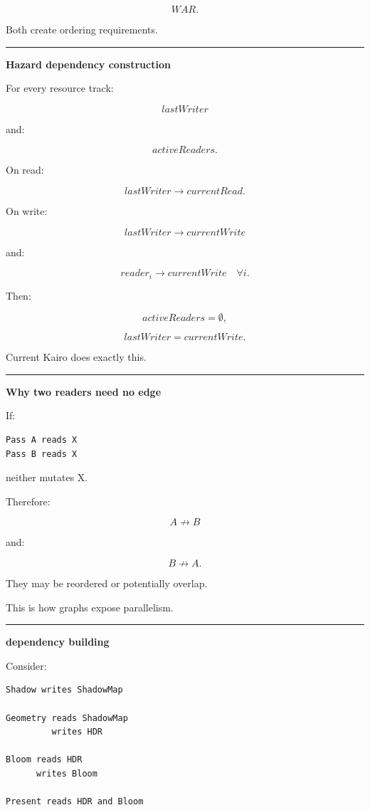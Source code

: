 \[
WAR.
\]

Both create ordering requirements.

\begin{center}\rule{0.5\linewidth}{0.5pt}\end{center}

\textbf{Hazard dependency construction}

For every resource track:

\[
lastWriter
\]

and:

\[
activeReaders.
\]

On read:

\[
lastWriter
\rightarrow
currentRead.
\]

On write:

\[
lastWriter
\rightarrow
currentWrite
\]

and:

\[
reader_i
\rightarrow
currentWrite
\quad\forall i.
\]

Then:

\[
activeReaders=\emptyset,
\]

\[
lastWriter=currentWrite.
\]

Current Kairo does exactly this.

\begin{center}\rule{0.5\linewidth}{0.5pt}\end{center}

\textbf{Why two readers need no edge}

If:

\begin{verbatim}
Pass A reads X
Pass B reads X
\end{verbatim}

neither mutates X.

Therefore:

\[
A
\not\rightarrow
B
\]

and:

\[
B
\not\rightarrow
A.
\]

They may be reordered or potentially overlap.

This is how graphs expose parallelism.

\begin{center}\rule{0.5\linewidth}{0.5pt}\end{center}

\textbf{dependency building}

Consider:

\begin{verbatim}
Shadow writes ShadowMap

Geometry reads ShadowMap
         writes HDR

Bloom reads HDR
      writes Bloom

Present reads HDR and Bloom
\end{verbatim}

